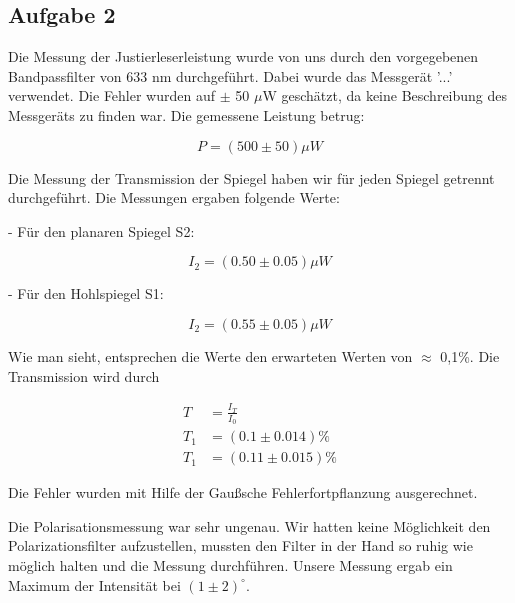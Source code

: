 \subsection{Aufgabe 2}

Die Messung der Justierleserleistung wurde von uns durch den vorgegebenen Bandpassfilter von 633 nm durchgeführt. Dabei wurde das Messgerät '...' verwendet. Die Fehler wurden auf $\pm$ 50 $\mu$W geschätzt, da keine Beschreibung des Messgeräts zu finden war. Die gemessene Leistung betrug:

\begin{equation}
P = (500 \pm 50) \mu W
\end{equation}

Die Messung der Transmission der Spiegel haben wir für jeden Spiegel getrennt durchgeführt. Die Messungen ergaben folgende Werte:

- Für den planaren Spiegel S2:

\begin{equation}
I_{2} = (0.50 \pm 0.05) \mu W
\end{equation}

- Für den Hohlspiegel S1:

\begin{equation}
	I_{2} = (0.55 \pm 0.05) \mu W
\end{equation}

Wie man sieht, entsprechen die Werte den erwarteten Werten von $\approx$ 0,1\%. Die Transmission wird durch 

\begin{align}
	T &= \frac{I_{T}}{I_{0}} \\
	T_{1} &= (0.1 \pm 0.014)\% \\
	T_{1} &= (0.11 \pm 0.015)\%
\end{align}

Die Fehler wurden mit Hilfe der Gaußsche Fehlerfortpflanzung ausgerechnet.

Die Polarisationsmessung war sehr ungenau. Wir hatten keine Möglichkeit den Polarizationsfilter aufzustellen, mussten den Filter in der Hand so ruhig wie möglich halten und die Messung durchführen. Unsere Messung ergab ein Maximum der Intensität bei $(1 \pm 2)^{\circ}$.

